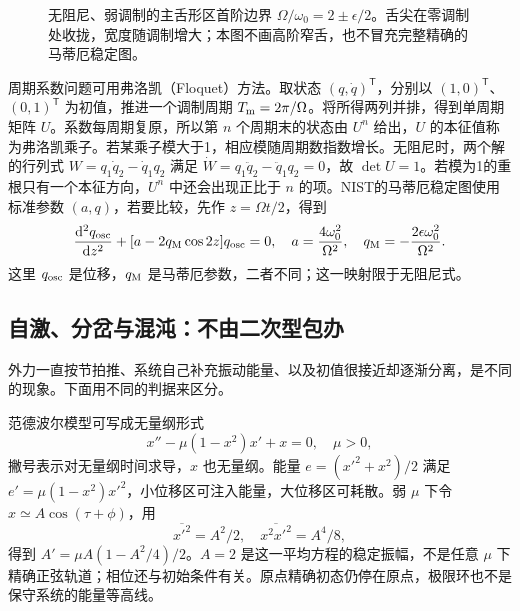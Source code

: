 \begin{figure}[htbp]
\centering
{}
\caption{无阻尼、弱调制的主舌形区首阶边界 $\Omega/\omega_0=2\pm\epsilon/2$。舌尖在零调制处收拢，宽度随调制增大；本图不画高阶窄舌，也不冒充完整精确的马蒂厄稳定图。}
\label{fig:parametric}
\end{figure}

周期系数问题可用弗洛凯（Floquet）方法。取状态 $(q,\dot q)^{\mathsf T}$，分别以 $(1,0)^{\mathsf T}$、$(0,1)^{\mathsf T}$ 为初值，推进一个调制周期 $T_{\rm m}=2\pi/\Omega$。将所得两列并排，得到单周期矩阵 $U$。系数每周期复原，所以第 $n$ 个周期末的状态由 $U^n$ 给出，$U$ 的本征值称为弗洛凯乘子。若某乘子模大于1，相应模随周期数指数增长。无阻尼时，两个解的行列式 $W=q_1\dot q_2-\dot q_1q_2$ 满足 $\dot W=q_1\ddot q_2-\ddot q_1q_2=0$，故 $\det U=1$。若模为1的重根只有一个本征方向，$U^n$ 中还会出现正比于 $n$ 的项。NIST的马蒂厄稳定图使用标准参数 $(a,q)$，若要比较，先作 $z=\Omega t/2$，得到
\[
\frac{\mathrm{d}^2q_{\rm osc}}{\mathrm{d} z^2}+[a-2q_{\rm M}\cos2z]q_{\rm osc}=0,\quad
a=\frac{4\omega_0^2}{\Omega^2},\quad q_{\rm M}=-\frac{2\epsilon\omega_0^2}{\Omega^2}.
\]
这里 $q_{\rm osc}$ 是位移，$q_{\rm M}$ 是马蒂厄参数，二者不同；这一映射限于无阻尼式。

\subsection{自激、分岔与混沌：不由二次型包办}
外力一直按节拍推、系统自己补充振动能量、以及初值很接近却逐渐分离，是不同的现象。下面用不同的判据来区分。

范德波尔模型可写成无量纲形式
\[
x''-\mu(1-x^2)x'+x=0,\quad \mu>0,
\]
撇号表示对无量纲时间求导，$x$ 也无量纲。能量 $e=(x'^2+x^2)/2$ 满足 $e'=\mu(1-x^2)x'^2$，小位移区可注入能量，大位移区可耗散。弱 $\mu$ 下令 $x\simeq A\cos(\tau+\phi)$，用
\[
\overline{x'^2}=A^2/2,\quad \overline{x^2x'^2}=A^4/8,
\]
得到 $A'=\mu A(1-A^2/4)/2$。$A=2$ 是这一平均方程的稳定振幅，不是任意 $\mu$ 下精确正弦轨道；相位还与初始条件有关。原点精确初态仍停在原点，极限环也不是保守系统的能量等高线。

